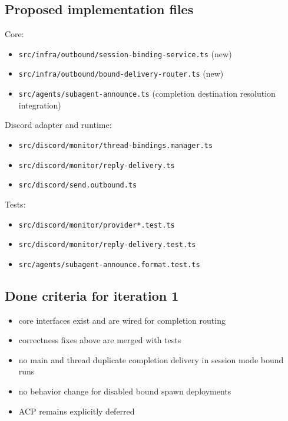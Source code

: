 \subsection{Proposed implementation files}


Core:

\begin{itemize}
  \item \texttt{src/infra/outbound/session-binding-service.ts} (new)
  \item \texttt{src/infra/outbound/bound-delivery-router.ts} (new)
  \item \texttt{src/agents/subagent-announce.ts} (completion destination resolution integration)
\end{itemize}


Discord adapter and runtime:

\begin{itemize}
  \item \texttt{src/discord/monitor/thread-bindings.manager.ts}
  \item \texttt{src/discord/monitor/reply-delivery.ts}
  \item \texttt{src/discord/send.outbound.ts}
\end{itemize}


Tests:

\begin{itemize}
  \item \texttt{src/discord/monitor/provider*.test.ts}
  \item \texttt{src/discord/monitor/reply-delivery.test.ts}
  \item \texttt{src/agents/subagent-announce.format.test.ts}
\end{itemize}


\subsection{Done criteria for iteration 1}


\begin{itemize}
  \item core interfaces exist and are wired for completion routing
  \item correctness fixes above are merged with tests
  \item no main and thread duplicate completion delivery in session mode bound runs
  \item no behavior change for disabled bound spawn deployments
  \item ACP remains explicitly deferred
\end{itemize}



\clearpage

